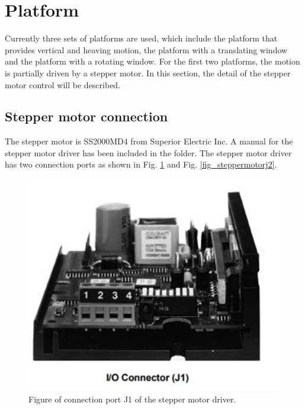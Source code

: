\documentclass[idxtotoc,hyperref,openany]{labbook} %
\begin{document}
\section{Platform}
Currently three sets of platforms are used, which include the platform that provides vertical and heaving motion, the platform with a translating window and the platform with a rotating window. For the first two platforms, the motion is partially driven by a stepper motor. In this section, the detail of the stepper motor control will be described. 



\subsection{Stepper motor connection}

The stepper motor is SS2000MD4 from Superior Electric Inc. A manual for the stepper motor driver has been included in the folder. The stepper motor driver has two connection ports as shown in Fig. \ref{fig_stepmotorj1} and Fig. \ref{fig_steppermotorj2}. 

\begin{figure}[h!]
\centering
\includegraphics[scale=0.5]{./Figure/fig_steppermotorj1}
\caption{Figure of connection port J1 of the stepper motor driver.}\label{fig_stepmotorj1}
\end{figure}
\end{document}
